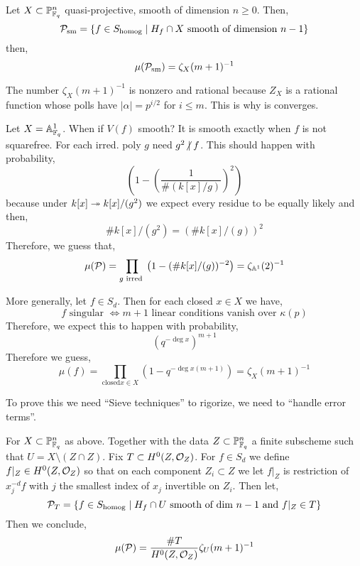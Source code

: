 \documentclass[12pt]{article}
\begin{document}
\begin{thm}[Poonen]
Let $X \subset \mathbb{P}^n_{\mathbb{F}_q}$ quasi-projective, smooth of dimension $n \ge 0$. Then,
\[ \mathcal{P}_{\text{sm}} = \{ f \in S_{\text{homog}} \mid H_f \cap X \text{ smooth of dimension } n - 1 \} \]
then,
\[ \mu(\mathcal{P}_{\text{sm}}) = \zeta_X(m+1)^{-1} \]
\end{thm}

\begin{rmk}
The number $\zeta_X(m+1)^{-1}$ is nonzero and rational because $Z_X$ is a rational function whose polls have $|\alpha| = p^{i/2}$ for $i \le m$. This is why is converges.
\end{rmk}

\begin{example}
Let $X = \mathbb{A}_{\mathbb{F}_q}^1$. When if $V(f)$ smooth? It is smooth exactly when $f$ is not squarefree. For each irred. poly $g$ need $g^2 \ndivides f$. This should happen with probability,
\[ \left( 1 - \left( \frac{1}{\# (k[x]/g)} \right)^2 \right) \]
because under $k[x] \twoheadrightarrow k[x]/(g^2)$ we expect every residue to be equally likely and then,
\[ \# k[x]/(g^2) = \left( \# k[x] / (g) \right)^2 \]
Therefore, we guess that,
\[ \mu(\mathcal{P}) = \prod_{g \text{ irred }} \left(1 - (\# k[x]/(g))^{-2} \right) = \zeta_{\mathbb{A}^1}(2)^{-1} \]
\end{example}

\begin{rmk}
More generally, let $f \in S_d$. Then for each closed $x \in X$ we have,
\[ f \text{ singular } \iff m + 1 \text{ linear conditions vanish over } \kappa(p) \]
Therefore, we expect this to happen with probability,
\[ \left( q^{-\deg{x}} \right)^{m + 1} \]
Therefore we guess,
\[ \mu(f) = \prod_{\text{closed} x \in X} \left( 1 - q^{-\deg{x} (m+1)} \right) = \zeta_X(m+1)^{-1} \]
\end{rmk}

To prove this we need ``Sieve techniques'' to rigorize, we need to ``handle error terms''. 

\begin{thm}
For $X \subset \mathbb{P}^n_{\mathbb{F}_q}$ as above. Together with the data $Z \subset \mathbb{P}_{\mathbb{F}_q}^n$ a finite subscheme such that $U = X \setminus (Z \cap Z)$. Fix $T \subset H^0(Z, \mathcal{O}_{Z})$. For $f \in S_d$ we define $f|_Z \in H^0(Z, \mathcal{O}_{Z})$ so that on each component $Z_i \subset Z$ we let $f|_Z$ is restriction of $x_j^{-d} f$ with $j$ the smallest index of $x_j$ invertible on $Z_i$. Then let,
\[ \mathcal{P}_T = \{ f \in S_{\text{homog}} \mid H_f \cap U \text{ smooth of dim } n - 1 \text{ and } f|_Z \in T \} \]
Then we conclude,
\[ \mu(\mathcal{P}) = \frac{\# T}{H^0(Z, \mathcal{O}_{Z})} \zeta_U(m+1)^{-1} \]
\end{thm}
 
\end{document}
